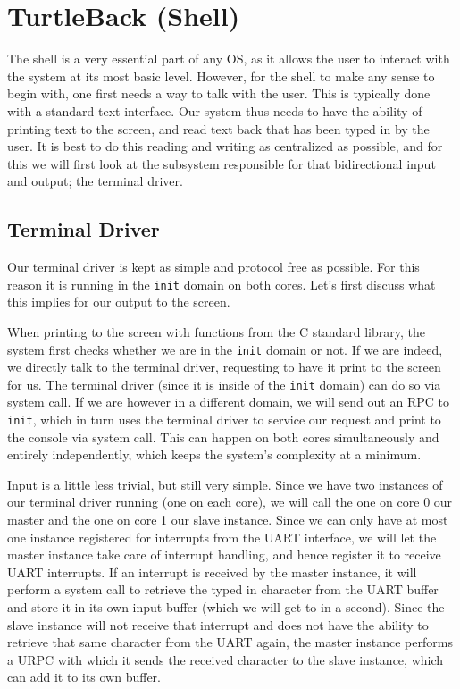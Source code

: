 \section{TurtleBack (Shell)}\label{s:turtle-back-shell}

The shell is a very essential part of any OS, as it allows the user to interact 
with the system at its most basic level. However, for the shell to make any 
sense to begin with, one first needs a way to talk with the user. This is 
typically done with a standard text interface. Our system thus needs to have 
the ability of printing text to the screen, and read text back that has been 
typed in by the user. It is best to do this reading and writing as centralized 
as possible, and for this we will first look at the subsystem responsible for 
that bidirectional input and output; the terminal driver.

\subsection{Terminal Driver}\label{ss:terminal-driver}

Our terminal driver is kept as simple and protocol free as possible. For this 
reason it is running in the \texttt{init} domain on both cores. Let's 
first discuss what this implies for our output to the screen.
\medskip

When printing to the screen with functions from the C standard library, the 
system first checks whether we are in the \texttt{init} domain or not. If we 
are indeed, we directly talk to the terminal driver, requesting to have it 
print to the screen for us. The terminal driver (since it is inside of the 
\texttt{init} domain) can do so via system call. If we are however in a 
different domain, we will send out an RPC to \texttt{init}, which in turn uses 
the terminal driver to service our request and print to the console via system 
call. This can happen on both cores simultaneously and entirely independently, 
which keeps the system's complexity at a minimum.
\medskip

Input is a little less trivial, but still very simple. Since we have two 
instances of our terminal driver running (one on each core), we will call the 
one on core 0 our master and the one on core 1 our slave instance. Since we can 
only have at most one instance registered for interrupts from the UART 
interface, we will let the master instance take care of interrupt handling, and 
hence register it to receive UART interrupts. If an interrupt is received by 
the master instance, it will perform a system call to retrieve the typed in 
character from the UART buffer and store it in its own input buffer (which we 
will get to in a second). Since the slave instance will not receive that 
interrupt and does not have the ability to retrieve that same character from 
the UART again, the master instance performs a URPC with which it sends the 
received character to the slave instance, which can add it to its own buffer.

